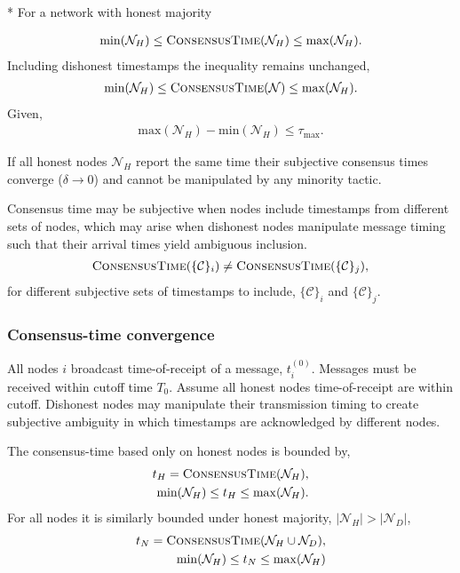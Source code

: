 * For a network with honest majority

\begin{align}
	\mathrm{min}(\mathcal{N}_H)\leq\textsc{ConsensusTime}(\mathcal{N}_H) \leq \mathrm{max}(\mathcal{N}_H).
\end{align}
Including dishonest timestamps the inequality remains unchanged,
\begin{align}
	\mathrm{min}(\mathcal{N}_H)\leq\textsc{ConsensusTime}(\mathcal{N}) \leq \mathrm{max}(\mathcal{N}_H).
\end{align}
Given,
\begin{align}
	\mathrm{max}(\mathcal{N}_H) - \mathrm{min}(\mathcal{N}_H) \leq  \tau_\mathrm{max}.
\end{align}

If all honest nodes $\mathcal{N}_H$ report the same time their subjective consensus times converge (\mbox{$\delta\to 0$}) and cannot be manipulated by any minority tactic.

Consensus time may be subjective when nodes include timestamps from different sets of nodes, which may arise when dishonest nodes manipulate message timing such that their arrival times yield ambiguous inclusion.
\begin{align}
	\textsc{ConsensusTime}(\{\mathcal{C}\}_i) \neq \textsc{ConsensusTime}(\{\mathcal{C}\}_j),
\end{align}
for different subjective sets of timestamps to include, $\{\mathcal{C}\}_i$ and $\{\mathcal{C}\}_j$.

\subsubsection{Consensus-time convergence}

All nodes $i$ broadcast time-of-receipt of a message, $t_i^{(0)}$. Messages must be received within cutoff time $T_0$. Assume all honest nodes time-of-receipt are within cutoff. Dishonest nodes may manipulate their transmission timing to create subjective ambiguity in which timestamps are acknowledged by different nodes.

The consensus-time based only on honest nodes is bounded by,
\begin{align}
	t_H = \textsc{ConsensusTime}(\mathcal{N}_H),\nonumber \\
	\mathrm{min}(\mathcal{N}_H) \leq t_H\leq \mathrm{max}(\mathcal{N}_H).
\end{align}
For all nodes it is similarly bounded under honest majority, \mbox{$|\mathcal{N}_H|>|\mathcal{N}_D|$},
\begin{align}
	t_N = \textsc{ConsensusTime}(\mathcal{N}_H\cup \mathcal{N}_D),\nonumber \\
	\mathrm{min}(\mathcal{N}_H) \leq t_N\leq \mathrm{max}(\mathcal{N}_H)
\end{align}

